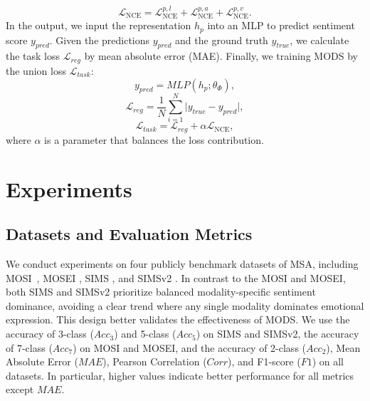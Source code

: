 \documentclass[letterpaper]{article} %
\begin{document}
\begin{equation}
    \mathcal{L}_{\text{NCE}} =   \mathcal{L}_{\text{NCE}}^{p,l
    } + \mathcal{L}_{\text{NCE}}^{p,a} + \mathcal{L}_{\text{NCE}}^{p,v}. 
\end{equation}
In the output, we input the representation $h_p$ into an MLP to predict sentiment score $y_{pred}$. Given the predictions $y_{pred}$ and the ground truth $y_{true}$, we calculate the task loss $ \mathcal{L}_{reg}$ by mean absolute error (MAE). Finally, we training MODS by the union loss $\mathcal{L}_{task}$:
\begin{equation}
    y_{pred} = MLP\left( h_{p};\theta_{\Phi} \right),
\end{equation}
\begin{equation}
   \mathcal{L}_{reg} = \frac{1}{N} \sum_{i=1}^{N} \lvert y_{true} - y_{pred} \rvert,
\end{equation}
\begin{equation}
    \mathcal{L}_{task} = \mathcal{L}_{reg} + \alpha \mathcal{L}_{\text{NCE}},
\end{equation}
where $\alpha$ is a parameter that balances the loss contribution.







\section{Experiments}

\subsection{Datasets and Evaluation Metrics}
We conduct experiments on four publicly benchmark datasets of MSA, including MOSI~\cite{zadeh2016mosi}, 
MOSEI \cite{zadeh2018multimodal},  SIMS \cite{yu2020ch}, and SIMSv2 \cite{liu2022make}. In contrast to the MOSI and MOSEI, both SIMS and SIMSv2 prioritize balanced modality-specific sentiment dominance, avoiding a clear trend where any single modality dominates emotional expression. This design better validates the effectiveness of MODS.
We use the accuracy of 3-class ($Acc_3$) and 5-class ($Acc_5$) on SIMS and SIMSv2, the accuracy of 7-class ($Acc_7$) on MOSI and MOSEI, and the accuracy of 2-class ($Acc_2$), Mean Absolute Error ($MAE$), Pearson Correlation ($Corr$), and F1-score ($F1$) on all datasets. In particular, higher values indicate better performance for all metrics except $MAE$.
\end{document}
